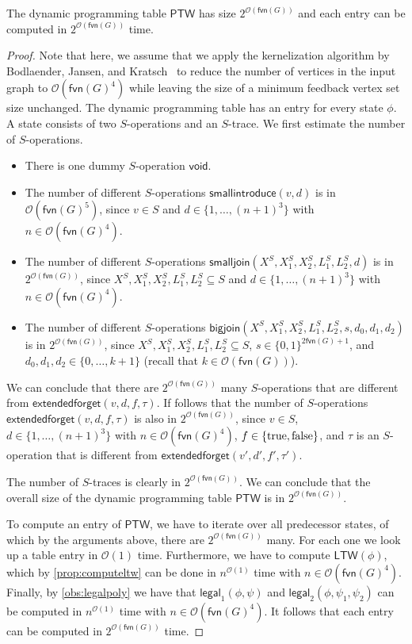 \documentclass[a4paper,UKenglish,cleveref, autoref, thm-restate, numberwithinsect]{lipics-v2021}
\newcounter{algorithm}
\newcommand{\OO}{\mathcal{O}}
\newcommand{\fvn}{\mathsf{fvn}}
\newcommand{\bigjoin}{\mathsf{bigjoin}}
\newcommand{\smallintroduce}{\mathsf{smallintroduce}}
\newcommand{\smalljoin}{\mathsf{smalljoin}}
\newcommand{\extendedforget}{\mathsf{extendedforget}}
\newcommand{\void}{\mathsf{void}}
\newcommand{\ptw}{\mathsf{PTW}}
\newcommand{\ltw}{\mathsf{LTW}}
\newcommand{\legal}{\mathsf{legal}}
\newcommand{\true}{\textup{true}}
\newcommand{\false}{\textup{false}}
\begin{document}
\begin{proposition}\label{prop:runningtime}
The dynamic programming table $\ptw$ has size $2^{\OO(\fvn(G))}$ and each entry can be computed in $2^{\OO(\fvn(G))}$ time.
\end{proposition}
\begin{proof}
Note that here, we assume that we apply the kernelization algorithm by Bodlaender, Jansen, and Kratsch~\cite{bodlaender2013preprocessing} to reduce the number of vertices in the input graph to $\OO(\fvn(G)^4)$ while leaving the size of a minimum feedback vertex set size unchanged.
The dynamic programming table has an entry for every state $\phi$. A state consists of two $S$-operations and an $S$-trace. We first estimate the number of $S$-operations.
\begin{itemize}
\item There is one dummy $S$-operation $\void$.
\item The number of different $S$-operations $\smallintroduce(v,d)$ is in $\OO(\fvn(G)^5)$, since $v\in S$ and $d\in\{1,\ldots,(n+1)^3\}$ with $n\in \OO(\fvn(G)^4)$.
\item The number of different $S$-operations $\smalljoin(X^S,X_1^S,X_2^S,L_{1}^S, L_{2}^S,d)$ is in $2^{\OO(\fvn(G))}$, since $X^S,X_1^S,X_2^S,L_{1}^S, L_{2}^S\subseteq S$ and $d\in\{1,\ldots,(n+1)^3\}$ with $n\in \OO(\fvn(G)^4)$.
\item The number of different $S$-operations $\bigjoin(X^S,X_1^S,X_2^S,L_{1}^S, L_{2}^S,s,d_0,d_1,d_2)$ is in $2^{\OO(\fvn(G))}$, since $X^S,X_1^S,X_2^S,L_{1}^S, L_{2}^S\subseteq S$, $s\in\{0,1\}^{2\fvn(G)+1}$, and $d_0,d_1,d_2\in\{0,\ldots,k+1\}$ (recall that $k\in \OO(\fvn(G))$).
\end{itemize}

We can conclude that there are $2^{\OO(\fvn(G))}$ many $S$-operations that are different from $\extendedforget(v,d,f,\tau)$.
If follows that the number of $S$-operations $\extendedforget(v,d,f,\tau)$ is also in $2^{\OO(\fvn(G))}$, since $v\in S$, $d\in\{1,\ldots,(n+1)^3\}$ with $n\in \OO(\fvn(G)^4)$, $f\in\{\true,\false\}$, and $\tau$ is an $S$-operation that is different from $\extendedforget(v',d',f',\tau')$.

The number of $S$-traces is clearly in $2^{\OO(\fvn(G))}$. We can conclude that the overall size of the dynamic programming table $\ptw$ is in $2^{\OO(\fvn(G))}$.

To compute an entry of $\ptw$, we have to iterate over all predecessor states, of which by the arguments above, there are $2^{\OO(\fvn(G))}$ many. For each one we look up a table entry in $\OO(1)$ time.
Furthermore, we have to compute $\ltw(\phi)$, which by \cref{prop:computeltw} can be done in $n^{\OO(1)}$ time with $n\in \OO(\fvn(G)^4)$.
Finally, by \cref{obs:legalpoly} we have that $\legal_1(\phi,\psi)$ and $\legal_2(\phi,\psi_1,\psi_2)$ can be computed in $n^{\OO(1)}$ time with $n\in \OO(\fvn(G)^4)$.
It follows that each entry can be computed in $2^{\OO(\fvn(G))}$ time.
\end{proof}
\end{document}
